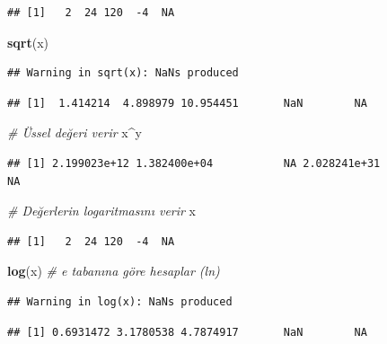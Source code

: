 \documentclass[
]{book}
\newenvironment{Shaded}{\begin{snugshade}}{\end{snugshade}}
\newcommand{\CommentTok}[1]{\textcolor[rgb]{0.56,0.35,0.01}{\textit{#1}}}
\newcommand{\FunctionTok}[1]{\textcolor[rgb]{0.13,0.29,0.53}{\textbf{#1}}}
\newcommand{\NormalTok}[1]{#1}
\newcommand{\SpecialCharTok}[1]{\textcolor[rgb]{0.81,0.36,0.00}{\textbf{#1}}}
\begin{document}
\begin{verbatim}
## [1]   2  24 120  -4  NA
\end{verbatim}

\begin{Shaded}
\begin{Highlighting}[]
\FunctionTok{sqrt}\NormalTok{(x)}
\end{Highlighting}
\end{Shaded}

\begin{verbatim}
## Warning in sqrt(x): NaNs produced
\end{verbatim}

\begin{verbatim}
## [1]  1.414214  4.898979 10.954451       NaN        NA
\end{verbatim}

\begin{Shaded}
\begin{Highlighting}[]
\CommentTok{\# Üssel değeri verir}
\NormalTok{x}\SpecialCharTok{\^{}}\NormalTok{y}
\end{Highlighting}
\end{Shaded}

\begin{verbatim}
## [1] 2.199023e+12 1.382400e+04           NA 2.028241e+31           NA
\end{verbatim}

\begin{Shaded}
\begin{Highlighting}[]
\CommentTok{\# Değerlerin logaritmasını verir}
\NormalTok{x}
\end{Highlighting}
\end{Shaded}

\begin{verbatim}
## [1]   2  24 120  -4  NA
\end{verbatim}

\begin{Shaded}
\begin{Highlighting}[]
\FunctionTok{log}\NormalTok{(x)   }\CommentTok{\# e tabanına göre hesaplar (ln)}
\end{Highlighting}
\end{Shaded}

\begin{verbatim}
## Warning in log(x): NaNs produced
\end{verbatim}

\begin{verbatim}
## [1] 0.6931472 3.1780538 4.7874917       NaN        NA
\end{verbatim}
\end{document}
